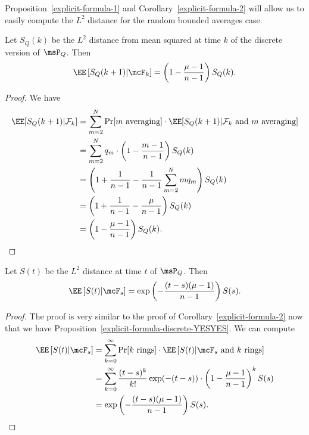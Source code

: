 \documentclass[12pt]{article}
\begin{document}
Proposition~\ref{explicit-formula-1} and Corollary~\ref{explicit-formula-2} will allow us to easily compute the $L^2$ distance for the random bounded averages case. 

\begin{prop} \label{explicit-formula-discrete-YESYES}
	Let $S_Q(k)$ be the $L^2$ distance from mean squared at time $k$ of the discrete version of $\msP_Q$. Then 
	\[
		\EE \left [ S_Q(k+1) | \mcF_k \right ] = \left ( 1 - \frac{\mu - 1}{n-1} \right ) S_Q(k). 
	\]
\end{prop}
\begin{proof}
	We have 
	\begin{align*}
		\EE[S_Q(k+1) | \mathcal{F}_k] & = \sum_{m = 2}^N \Pr[m \text{ averaging}] \cdot \EE[S_Q(k+1) | \mathcal{F}_k \text{ and } m \text{ averaging}] \\
		& = \sum_{m = 2}^N q_m \cdot \left ( 1 - \frac{m -1}{n-1} \right ) S_Q(k) \\
		& = \left ( 1 + \frac{1}{n-1} - \frac{1}{n-1} \sum_{m = 2}^N mq_m \right ) S_Q(k) \\
		& = \left ( 1 + \frac{1}{n-1} - \frac{\mu}{n-1} \right ) S_Q(k) \\
		& = \left ( 1 - \frac{\mu - 1}{n-1} \right ) S_Q(k). 
	\end{align*}
\end{proof}

\begin{cor} \label{explicit-formula-continuous-YESYES}
	Let $S(t)$ be the $L^2$ distance at time $t$ of $\msP_Q$. Then 
	\[
		\EE \left [ S(t) | \mcF_s \right ] = \exp \left ( - \frac{(t-s)(\mu - 1)}{n-1} \right ) S(s).
	\]
\end{cor}

\begin{proof}
	The proof is very similar to the proof of Corollary~\ref{explicit-formula-2} now that we have Proposition~\ref{explicit-formula-discrete-YESYES}. We can compute 
	\begin{align*}
		\EE \left [S(t) | \mcF_s \right ] & = \sum_{k = 0}^\infty \Pr[k \text{ rings}] \cdot \EE \left [ S(t) | \mcF_s \text{ and } k \text{ rings} \right ] \\
		& = \sum_{k = 0}^\infty \frac{(t-s)^k}{k!} \exp (-(t-s)) \cdot \left ( 1 - \frac{\mu - 1}{n-1} \right )^k S(s) \\
		& = \exp \left ( - \frac{(t-s) (\mu - 1)}{n-1} \right ) S(s). 
	\end{align*}
\end{proof}
\end{document}
